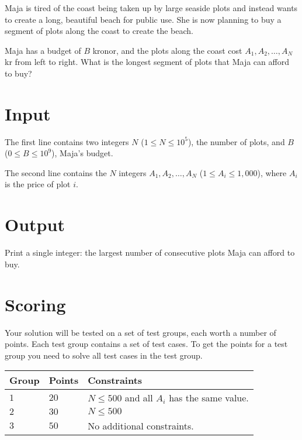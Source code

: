 \noindent
Maja is tired of the coast being taken up by large seaside plots and instead wants to create a long, beautiful beach for public use.
She is now planning to buy a segment of plots along the coast to create the beach.

Maja has a budget of $B$ kronor, and the plots along the coast cost $A_1, A_2, \dots, A_N$ kr from left to right.
What is the longest segment of plots that Maja can afford to buy?

\section*{Input}
The first line contains two integers $N$ ($1 \leq N \leq 10^5$), the number of plots, and $B$ ($0 \leq B \leq 10^9$), Maja's budget.

The second line contains the $N$ integers $A_1, A_2, \dots, A_N$ ($1 \le A_i \le 1,000$), where $A_i$ is the price of plot $i$.

\section*{Output}
Print a single integer: the largest number of consecutive plots Maja can afford to buy.

\section*{Scoring}
Your solution will be tested on a set of test groups, each worth a number of points. Each test group contains
a set of test cases. To get the points for a test group you need to solve all test cases in the test group.

\noindent
\begin{tabular}{| l | l | l |}
  \hline
  \textbf{Group} & \textbf{Points} & \textbf{Constraints} \\ \hline
  $1$   & $20$       & $N \leq 500 $ and all $A_i$ has the same value.\\ \hline
  $2$   & $30$       & $N \leq 500 $\\ \hline
  $3$   & $50$       & No additional constraints. \\ \hline
\end{tabular}
